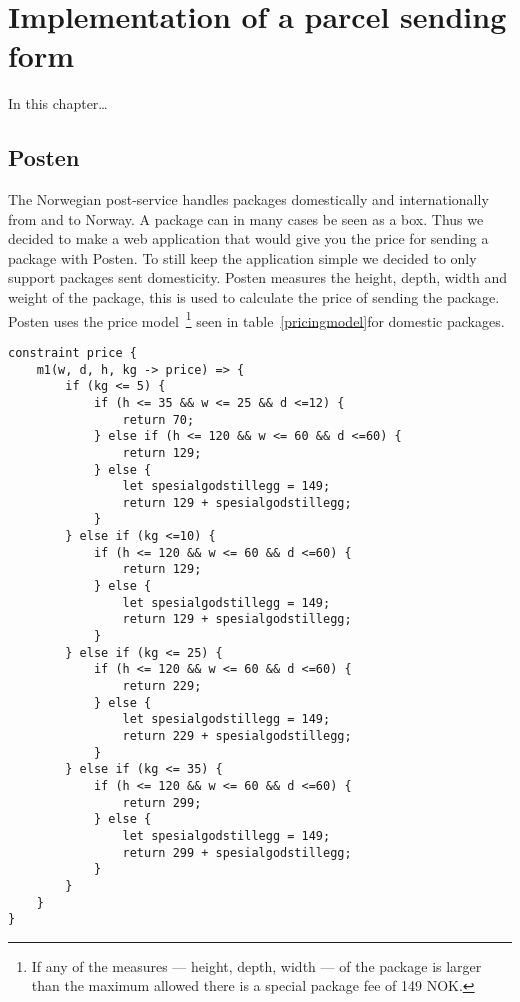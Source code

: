 \chapter{Implementation of a parcel sending form}

In this chapter…

\section{Posten}
The Norwegian post-service handles packages domestically and internationally from 
and to Norway. A package can in many cases be seen as a box. Thus we decided to make a web application that would give you the price for sending a package with Posten. To still keep the application simple we decided to only support packages sent domesticity. Posten measures the height, depth, width and weight of the package, this is used to calculate the price of sending the package. Posten uses the price model~\cite{postenNorgespakken}\footnote{If any of the measures --- height, depth, width --- of the package is larger than the maximum allowed there is a special package fee of 149 NOK.} seen in table~\ref{pricingmodel}for domestic packages.

\begin{lstlisting}[caption={HotDrink logic for determining the price},label=hotdrinkprice, language=hotdrink]
constraint price {
    m1(w, d, h, kg -> price) => {
        if (kg <= 5) {
            if (h <= 35 && w <= 25 && d <=12) {
                return 70;
            } else if (h <= 120 && w <= 60 && d <=60) {
                return 129;
            } else {
                let spesialgodstillegg = 149;
                return 129 + spesialgodstillegg;
            }
        } else if (kg <=10) {
            if (h <= 120 && w <= 60 && d <=60) {
                return 129;
            } else {
                let spesialgodstillegg = 149;
                return 129 + spesialgodstillegg;
            }
        } else if (kg <= 25) {
            if (h <= 120 && w <= 60 && d <=60) {
                return 229;
            } else {
                let spesialgodstillegg = 149;
                return 229 + spesialgodstillegg;
            }
        } else if (kg <= 35) {
            if (h <= 120 && w <= 60 && d <=60) {
                return 299;
            } else {
                let spesialgodstillegg = 149;
                return 299 + spesialgodstillegg;
            }
        }
    }
}
\end{lstlisting}

